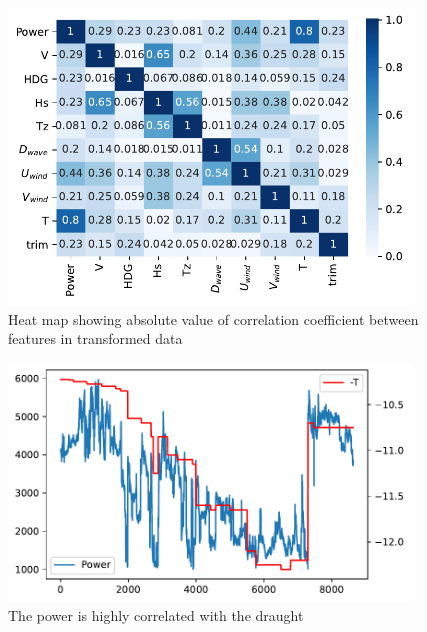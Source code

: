 \begin{figure}[H]
\begin{center}\includegraphics[width = 0.95\textwidth]{figures/heat_map_data.pdf}\end{center}
\vspace{-0.7cm}
\caption{Heat map showing absolute value of correlation coefficient between features in transformed data}
\label{fig:heat_map_data}
\end{figure}
\begin{figure}[H]
\begin{center}\includegraphics[width = 0.95\textwidth]{figures/power_draught.pdf}\end{center}
\vspace{-0.7cm}
\caption{The power is highly correlated with the draught}
\label{fig:power_draught}
\end{figure}
